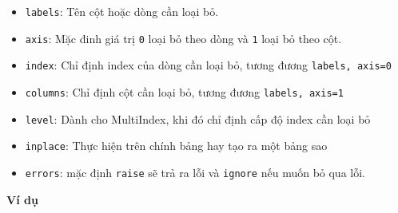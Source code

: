 \documentclass[
]{book}
\begin{document}
\begin{itemize}
\item
  \texttt{labels}: Tên cột hoặc dòng cần loại bỏ.
\item
  \texttt{axis}: Mặc đinh giá trị \texttt{0} loại bỏ theo dòng và \texttt{1} loại bỏ theo cột.
\item
  \texttt{index}: Chỉ định index của dòng cần loại bỏ, tương đương \texttt{labels,\ axis=0}
\item
  \texttt{columns}: Chỉ định cột cần loại bỏ, tương đương \texttt{labels,\ axis=1}
\item
  \texttt{level}: Dành cho MultiIndex, khi đó chỉ định cấp độ index cần loại bỏ
\item
  \texttt{inplace}: Thực hiện trên chính bảng hay tạo ra một bảng sao
\item
  \texttt{errors}: mặc định \texttt{raise} sẽ trả ra lỗi và \texttt{ignore} nếu muốn bỏ qua lỗi.
\end{itemize}

\textbf{Ví dụ}
\end{document}
